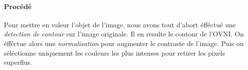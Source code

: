 	\paragraph{Procédé}	
		Pour mettre en valeur l'objet de l'image, nous avons tout d'abort éfféctué une \emph{detection de contour} sur l'image originale. Il en resulte le contour de l'OVNI. On éfféctue alors une \emph{normalisation} pour augmenter le contraste de l'image. Puis on séléctionne uniquement les couleurs les plus intenses pour retirer les pixels superflus.